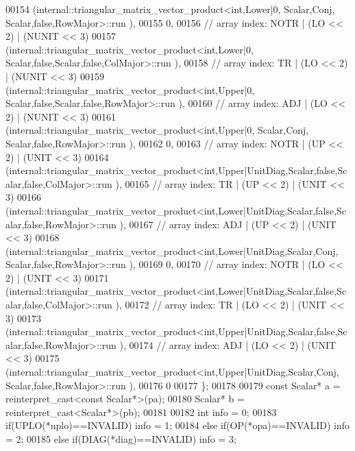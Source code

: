 \begin{DoxyCode}
00154     (internal::triangular\_matrix\_vector\_product<int,Lower|0,       Scalar,Conj, Scalar,false,RowMajor>::run
      ),
00155     0,
00156     \textcolor{comment}{// array index: NOTR  | (LO << 2) | (NUNIT << 3)}
00157     (internal::triangular\_matrix\_vector\_product<int,Lower|0,       Scalar,false,Scalar,false,ColMajor>::run
      ),
00158     \textcolor{comment}{// array index: TR    | (LO << 2) | (NUNIT << 3)}
00159     (internal::triangular\_matrix\_vector\_product<int,Upper|0,       Scalar,false,Scalar,false,RowMajor>::run
      ),
00160     \textcolor{comment}{// array index: ADJ   | (LO << 2) | (NUNIT << 3)}
00161     (internal::triangular\_matrix\_vector\_product<int,Upper|0,       Scalar,Conj, Scalar,false,RowMajor>::run
      ),
00162     0,
00163     \textcolor{comment}{// array index: NOTR  | (UP << 2) | (UNIT  << 3)}
00164     (internal::triangular\_matrix\_vector\_product<int,Upper|UnitDiag,Scalar,false,Scalar,false,ColMajor>::run
      ),
00165     \textcolor{comment}{// array index: TR    | (UP << 2) | (UNIT  << 3)}
00166     (internal::triangular\_matrix\_vector\_product<int,Lower|UnitDiag,Scalar,false,Scalar,false,RowMajor>::run
      ),
00167     \textcolor{comment}{// array index: ADJ   | (UP << 2) | (UNIT  << 3)}
00168     (internal::triangular\_matrix\_vector\_product<int,Lower|UnitDiag,Scalar,Conj, Scalar,false,RowMajor>::run
      ),
00169     0,
00170     \textcolor{comment}{// array index: NOTR  | (LO << 2) | (UNIT  << 3)}
00171     (internal::triangular\_matrix\_vector\_product<int,Lower|UnitDiag,Scalar,false,Scalar,false,ColMajor>::run
      ),
00172     \textcolor{comment}{// array index: TR    | (LO << 2) | (UNIT  << 3)}
00173     (internal::triangular\_matrix\_vector\_product<int,Upper|UnitDiag,Scalar,false,Scalar,false,RowMajor>::run
      ),
00174     \textcolor{comment}{// array index: ADJ   | (LO << 2) | (UNIT  << 3)}
00175     (internal::triangular\_matrix\_vector\_product<int,Upper|UnitDiag,Scalar,Conj, Scalar,false,RowMajor>::run
      ),
00176     0
00177   \};
00178 
00179   \textcolor{keyword}{const} Scalar* a = \textcolor{keyword}{reinterpret\_cast<}\textcolor{keyword}{const }Scalar*\textcolor{keyword}{>}(pa);
00180   Scalar* b = \textcolor{keyword}{reinterpret\_cast<}Scalar*\textcolor{keyword}{>}(pb);
00181 
00182   \textcolor{keywordtype}{int} info = 0;
00183   \textcolor{keywordflow}{if}(UPLO(*uplo)==INVALID)                                            info = 1;
00184   \textcolor{keywordflow}{else} \textcolor{keywordflow}{if}(OP(*opa)==INVALID)                                          info = 2;
00185   \textcolor{keywordflow}{else} \textcolor{keywordflow}{if}(DIAG(*diag)==INVALID)                                       info = 3;

\end{DoxyCode}
